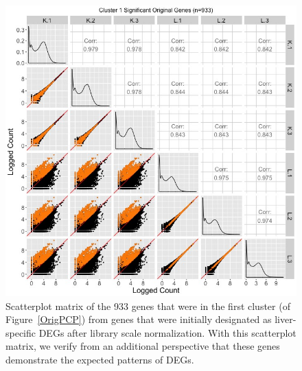 \documentclass{article}
\begin{document}
\null
\begin{figure}[t!]
\centerline{\includegraphics[width=1\columnwidth]{../Bioinformatics/Pictures/liverKidney/Clustering_data_FDR_001_TMMvRaw_Orig/K_L_Sig_SM_Orig_8_1.jpg}}
\caption{Scatterplot matrix of the 933 genes that were in the first cluster (of Figure~\ref{OrigPCP}) from genes that were initially designated as liver-specific DEGs after library scale normalization. With this scatterplot matrix, we verify from an additional perspective that these genes demonstrate the expected patterns of DEGs.
\label{OrigSM}}
\end{figure}
\end{document}
